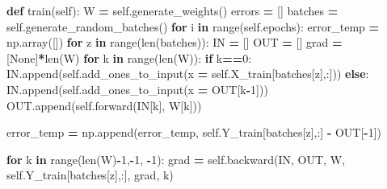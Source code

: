 \documentclass[
]{book}
\newenvironment{Shaded}{\begin{snugshade}}{\end{snugshade}}
\newcommand{\BuiltInTok}[1]{#1}
\newcommand{\ControlFlowTok}[1]{\textcolor[rgb]{0.13,0.29,0.53}{\textbf{#1}}}
\newcommand{\DecValTok}[1]{\textcolor[rgb]{0.00,0.00,0.81}{#1}}
\newcommand{\KeywordTok}[1]{\textcolor[rgb]{0.13,0.29,0.53}{\textbf{#1}}}
\newcommand{\NormalTok}[1]{#1}
\newcommand{\OperatorTok}[1]{\textcolor[rgb]{0.81,0.36,0.00}{\textbf{#1}}}
\newcommand{\VariableTok}[1]{\textcolor[rgb]{0.00,0.00,0.00}{#1}}
\begin{document}
\begin{Shaded}
\begin{Highlighting}[]
  \KeywordTok{def}\NormalTok{ train(}\VariableTok{self}\NormalTok{):}
\NormalTok{    W }\OperatorTok{=} \VariableTok{self}\NormalTok{.generate\_weights()}
\NormalTok{    errors }\OperatorTok{=}\NormalTok{ []}
\NormalTok{    batches }\OperatorTok{=} \VariableTok{self}\NormalTok{.generate\_random\_batches()}
    \ControlFlowTok{for}\NormalTok{ i }\KeywordTok{in} \BuiltInTok{range}\NormalTok{(}\VariableTok{self}\NormalTok{.epochs):}
\NormalTok{      error\_temp }\OperatorTok{=}\NormalTok{ np.array([])}
      \ControlFlowTok{for}\NormalTok{ z }\KeywordTok{in} \BuiltInTok{range}\NormalTok{(}\BuiltInTok{len}\NormalTok{(batches)):}
\NormalTok{        IN }\OperatorTok{=}\NormalTok{ []}
\NormalTok{        OUT }\OperatorTok{=}\NormalTok{ []}
\NormalTok{        grad }\OperatorTok{=}\NormalTok{ [}\VariableTok{None}\NormalTok{]}\OperatorTok{*}\BuiltInTok{len}\NormalTok{(W)}
        \ControlFlowTok{for}\NormalTok{ k }\KeywordTok{in} \BuiltInTok{range}\NormalTok{(}\BuiltInTok{len}\NormalTok{(W)):}
          \ControlFlowTok{if}\NormalTok{ k}\OperatorTok{==}\DecValTok{0}\NormalTok{:}
\NormalTok{            IN.append(}\VariableTok{self}\NormalTok{.add\_ones\_to\_input(x }\OperatorTok{=} \VariableTok{self}\NormalTok{.X\_train[batches[z],:]))}
          \ControlFlowTok{else}\NormalTok{:}
\NormalTok{            IN.append(}\VariableTok{self}\NormalTok{.add\_ones\_to\_input(x }\OperatorTok{=}\NormalTok{ OUT[k}\OperatorTok{{-}}\DecValTok{1}\NormalTok{]))}
\NormalTok{          OUT.append(}\VariableTok{self}\NormalTok{.forward(IN[k], W[k]))}
          
\NormalTok{        error\_temp }\OperatorTok{=}\NormalTok{ np.append(error\_temp, }\VariableTok{self}\NormalTok{.Y\_train[batches[z],:] }\OperatorTok{{-}}\NormalTok{ OUT[}\OperatorTok{{-}}\DecValTok{1}\NormalTok{])}
          
        \ControlFlowTok{for}\NormalTok{ k }\KeywordTok{in} \BuiltInTok{range}\NormalTok{(}\BuiltInTok{len}\NormalTok{(W)}\OperatorTok{{-}}\DecValTok{1}\NormalTok{,}\OperatorTok{{-}}\DecValTok{1}\NormalTok{, }\OperatorTok{{-}}\DecValTok{1}\NormalTok{):}
\NormalTok{          grad }\OperatorTok{=} \VariableTok{self}\NormalTok{.backward(IN, OUT, W, }\VariableTok{self}\NormalTok{.Y\_train[batches[z],:], grad, k) }
          

\end{Highlighting}
\end{Shaded}
\end{document}
